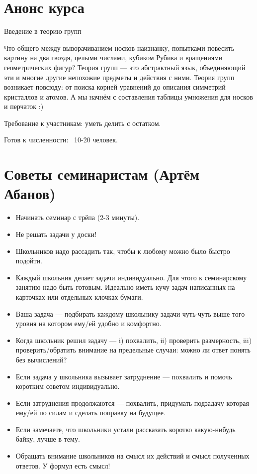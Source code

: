 \documentclass[12pt]{article} %
\begin{document}
\section{Анонс курса}

Введение в теорию групп

Что общего между выворачиванием носков наизнанку, попытками повесить картину на два гвоздя, целыми числами, кубиком Рубика и вращениями геометрических фигур? Теория групп — это абстрактный язык, объединяющий эти и многие другие непохожие предметы и действия с ними.
Теория групп возникает повсюду: от поиска корней уравнений до описания симметрий кристаллов и атомов. А мы начнём с составления таблицы умножения для носков и перчаток :)

Требование к участникам: уметь делить с остатком.

Готов к численности: ~10-20 человек.


\section{Советы семинаристам (Артём Абанов)}
\begin{itemize}\baselineskip
\item Начинать семинар с трёпа (2-3 минуты).
\item Не решать задачи у доски!
\item Школьников надо рассадить так, чтобы к любому можно было быстро подойти.
\item Каждый школьник делает задачи индивидуально. Для этого к семинарскому занятию надо быть готовым. Идеально иметь кучу задач написанных на карточках или отдельных клочках бумаги.
\item Ваша задача — подбирать каждому школьнику задачи чуть-чуть выше того уровня на котором ему/ей удобно и комфортно.
\item Когда школьник решил задачу — i) похвалить, ii) проверить размерность, iii) проверить/обратить внимание на предельные случаи: можно ли ответ понять без вычислений?
\item Если задача у школьника вызывает затруднение — похвалить и помочь коротким советом индивидуально.
\item Если затруднения продолжаются — похвалить, придумать подзадачу которая ему/ей по силам и сделать поправку на будущее.
\item Если замечаете, что школьники устали рассказать коротко какую-нибудь байку, лучше в тему.
\item Обращать внимание школьников на смысл их действий и смысл полученных ответов. У формул есть смысл!
\end{itemize}
\end{document}
